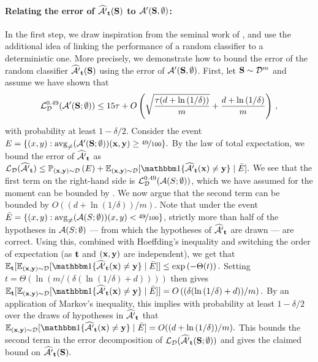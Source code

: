 \paragraph{Relating the error of $ \widehat{\mathcal{A}'}_{\mathbf{t}}(\mathbf{S}) $ to $ \mathcal{A}'(\mathbf{S},\emptyset) $:}
In the first step, we draw inspiration from the seminal work of \cite{baggingoptimal}, and use the additional idea of linking the performance of a random classifier to a deterministic one. More precisely, we demonstrate how to bound the error of the random classifier $\widehat{\mathcal{A}'}_{\mathbf{t}}(\mathbf{S})$ 
using the error of $ \mathcal{A}'(\mathbf{S},\emptyset)$. 
First, let $\mathbf{S} \sim \mathcal{D}^m$ and
assume we have shown that 
\begin{align}\label{eq:proofsketch-1}
    \operatorname{\mathcal{L}}_{\mathcal{D}}^{0.49}(\mathcal{A}'(\mathbf{S};\emptyset))\leq 15\tau+O\left(\sqrt{\frac{\tau(d+\ln{\left(1/\delta \right)})}{m}}+\frac{d+\ln{\left(1/\delta  \right)}}{m}\right)\,,
  \end{align} 
with probability at least $ 1-\delta/2.$ Consider the event $ E=\{ (x,y):  \operatorname{\mathrm{avg}_{\not=}}(\mathcal{A}'(\mathbf{S};\emptyset))(\mathbf{x},\mathbf{y}) \geq \nicefrac{49}{100}\}.$ 
By the law of total expectation, we bound the error of $ \widehat{\mathcal{A}'}_{\mathbf{t}} $ as  $ \ls_{\cD}(\widehat{\erm'}_{\rt})\leq \p_{(\rx,\ry)\sim\cD}\left(E\right)+\e_{(\rx,\ry)\sim \cD}[\ind\{\widehat{\erm'}_{\rt}(\rx)\not=\ry  \}\mid \bar{E} ].$ 
We see that the first term on the right-hand side is $ \operatorname{\mathcal{L}}_{\mathcal{D}}^{0.49}(\mathcal{A}(S;\emptyset)) $, which we have assumed for the moment can be bounded by . We now argue that the second term can be bounded by $ O((d+\ln{\left(1/\delta \right)})/m).$  
Note that under the event $ \bar{E}=\{ (x,y):  \operatorname{\mathrm{avg}_{\not=}}(\mathcal{A}(S;\emptyset))(x,y) < \nicefrac{49}{100} \}$, strictly more than half of the hypotheses in $ \mathcal{A}(S;\emptyset)$ --- from which the hypotheses of $ \widehat{\mathcal{A}'}_{\mathbf{t}} $ are drawn --- are correct. 
Using this, combined with Hoeffding's inequality and switching the order of expectation (as $ \mathbf{t} $ and $ (\mathbf{x},\mathbf{y}) $ are independent), we get that $ \e_{\rt}[\e_{(\rx,\ry)\sim\cD}[\ind\{\widehat{\erm'}_{\rt}(\rx)\not=\ry  \}\mid \bar{E} ]] \leq \exp\left(-\Theta(t)\right).$ 
Setting $ t=\Theta(\ln{\left(m/(\delta(\ln{\left(1/\delta \right)}+d)) \right)})$ then gives  $\e_{\rt}[\e_{(\rx,\ry)\sim\cD}[\ind\{\widehat{\erm'}_{\rt}(\rx)\not=\ry  \}\mid \bar{E} ] ]=O\left((\delta(\ln{\left(1/\delta \right)}+d))/m\right).$ 
By an application of Markov's inequality, this implies with probability at least $ 1-\delta/2 $ over the draws of hypotheses in $ \widehat{\mathcal{A}'}_{\mathbf{t}}$ that $ \e_{(\rx,\ry)\sim\cD}[\ind\{\widehat{\erm'}_{\rt}(\rx)\not=\ry  \}\mid \bar{E} ]=O((d+\ln{\left(1/\delta \right)})/m).$
This bounds the second term in the error decomposition of $ \operatorname{\mathcal{L}}_{\mathcal{D}}(\widehat{\mathcal{A}'}_{\mathbf{t}}(\mathbf{S};\emptyset))$ and  gives the claimed bound on $ \widehat{\mathcal{A}'}_{\mathbf{t}}(\mathbf{S}).$ 

